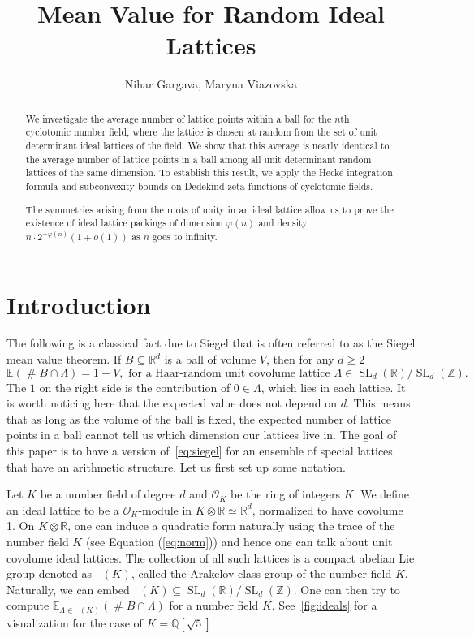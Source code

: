 \documentclass[a4paper]{article}
\title{Mean Value for Random Ideal Lattices}
\author{Nihar Gargava, Maryna Viazovska}
\theoremstyle{definition}
\theoremstyle{remark}
\DeclareMathOperator{\SL}{SL}
\DeclareMathOperator{\card}{\#}
\DeclareMathOperator{\Ar}{\widetilde{Cl}}
\newcommand{\OK}{\mathcal{O}_K}
\begin{document}
\maketitle

\begin{abstract}
We investigate the average number of lattice points within a ball for the $n$th cyclotomic number field, where the lattice is chosen at random from the set of unit determinant ideal lattices of the field. We show that this average is nearly identical to the average number of lattice points in a ball among all unit determinant random lattices of the same dimension. To establish this result, we apply the Hecke integration formula and subconvexity bounds on Dedekind zeta functions of cyclotomic fields. 

The symmetries arising from the roots of unity in an ideal lattice allow us to prove the existence of ideal lattice packings of dimension $\varphi(n)$ and density $ n \cdot 2^{- \varphi(n)}  (1+o(1))$ as $n$ goes to infinity.
\end{abstract}

\section*{Introduction}


The following is a classical fact due to Siegel \cite{Sie45} that is often referred to as the Siegel mean value theorem. If $B \subseteq \mathbb{R}^{d}$ is a ball of volume $V$, then for any $d \geq 2$
\begin{equation}
	\mathbb{E} (\card B \cap \Lambda) = 1 + V, {\text{ for a Haar-random unit covolume lattice }\Lambda \in \SL_{d}(\mathbb{R})/\SL_{d}(\mathbb{Z})}.
	\label{eq:siegel}
\end{equation}
The $1$ on the right  side is the contribution of $0 \in \Lambda$, which lies in each lattice. It is worth noticing here that the expected value does not depend on $d$. This means that as long as the volume of the ball is fixed, the expected number of lattice points in a ball cannot tell us which dimension our lattices live in.
The goal of this paper is to have a version of~\cref{eq:siegel} 
for an ensemble of special lattices that have an arithmetic structure. Let us first set up some notation.



Let $K$ be a number field of degree $d$ and $\OK$ be the ring of integers $K$.
We define an ideal lattice to be a 
$\OK$-module in $K \otimes \mathbb{R} \simeq \mathbb{R}^{d}$, normalized to have covolume 1.
On $K \otimes \mathbb{R}$, one can induce a quadratic form naturally using the trace of the number field $K$ (see Equation (\ref{eq:norm})) and hence one can talk about unit covolume ideal lattices. 
The collection of all such lattices is a compact abelian Lie group denoted as $\Ar(K)$, called the Arakelov class group \cite{BDPW20} of the number field $K$. 
Naturally, we can embed $\Ar(K) \subseteq \SL_d(\mathbb{R})/\SL_d(\mathbb{Z})$.
One can then try to compute $\mathbb{E}_{\Lambda \in \Ar(K)} ( \card B \cap \Lambda)$ for a number field $K$.
See~\cref{fig:ideals} for a visualization for the case of $K=\mathbb{Q}[\sqrt{5}]$.
\end{document}
